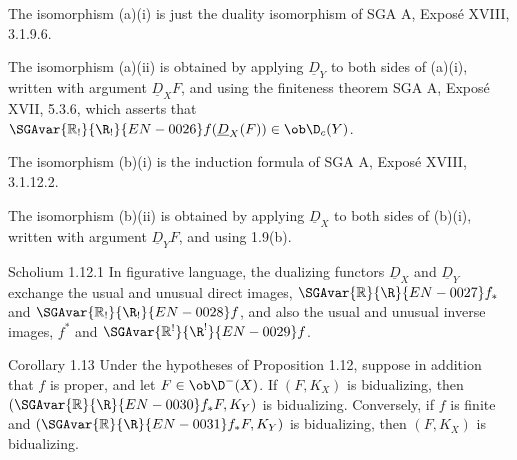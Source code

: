 \begin{prooftext}
The isomorphism (a)(i) is just the duality isomorphism of SGA A, Exposé XVIII, 3.1.9.6.

The isomorphism (a)(ii) is obtained by applying $\underline D_Y$ to both sides of (a)(i), written with argument $\underline D_XF$, and using the finiteness theorem SGA A, Exposé XVII, 5.3.6, which asserts that $\SGAvar{\mathbb{R}_!}{\R_!}{EN-0026}f(\underline D_X(F))\in\ob\D_c(Y)$.

The isomorphism (b)(i) is the induction formula of SGA A, Exposé XVIII, 3.1.12.2.

The isomorphism (b)(ii) is obtained by applying $\underline D_X$ to both sides of (b)(i), written with argument $\underline D_YF$, and using 1.9(b). \qedtext
\end{prooftext}

\begin{statement}{Scholium 1.12.1}
In figurative language, the dualizing functors $\underline D_X$ and $\underline D_Y$ exchange the usual and unusual direct images, $\SGAvar{\mathbb{R}}{\R}{EN-0027} f_*$ and $\SGAvar{\mathbb{R}_!}{\R_!}{EN-0028}f$, and also the usual and unusual inverse images, $f^*$ and $\SGAvar{\mathbb{R}^!}{\R^!}{EN-0029}f$.
\end{statement}

\begin{statement}{Corollary 1.13}
Under the hypotheses of Proposition 1.12, suppose in addition that $f$ is proper, and let $F\in\ob\D^-(X)$. If $(F,K_X)$ is bidualizing, then $(\SGAvar{\mathbb{R}}{\R}{EN-0030} f_*F,K_Y)$ is bidualizing. Conversely, if $f$ is finite and $(\SGAvar{\mathbb{R}}{\R}{EN-0031} f_*F,K_Y)$ is bidualizing, then $(F,K_X)$ is bidualizing.
\end{statement}

